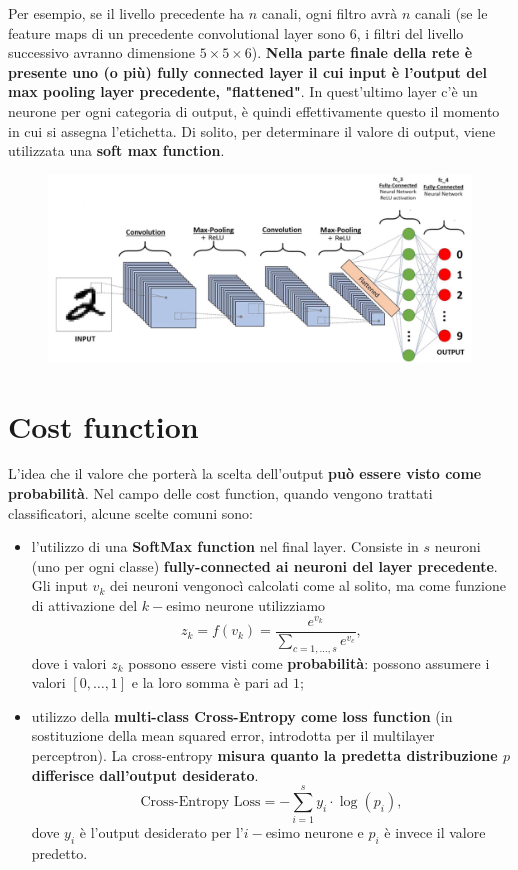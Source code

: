 Per esempio, se il livello precedente ha $n$ canali, ogni filtro avrà $n$ canali (se le feature maps di un precedente convolutional layer sono $6$, i filtri del livello successivo avranno dimensione $5\times5\times6$).
\newline
\newline
\textbf{Nella parte finale della rete è presente uno (o più)  fully connected layer il cui input è l'output del max pooling layer precedente, "flattened"}. In quest'ultimo layer c'è un neurone per ogni categoria di output, è quindi effettivamente questo il momento in cui si assegna l'etichetta. Di solito, per determinare il valore di output, viene utilizzata una \textbf{soft max function}.
\begin{figure}[!h]
    \includegraphics[scale=.5]{images/cnn/last_layer.png}
    \centering
\end{figure}
\newpage
\section{Cost function}
L'idea che il valore che porterà la scelta dell'output \textbf{può essere visto come probabilità}. Nel campo delle cost function, quando vengono trattati classificatori, alcune scelte comuni sono:
\begin{itemize}
    \item l'utilizzo di una \textbf{SoftMax function} nel final layer. Consiste in $s$ neuroni (uno per ogni classe) \textbf{fully-connected ai neuroni del layer precedente}. Gli input $v_k$ dei neuroni vengonocì calcolati come al solito, ma come funzione di attivazione del $k-$esimo neurone utilizziamo
    \begin{equation}
        z_k=f(v_k)=\frac{e^{v_k}}{\sum_{c=1,\dots,s}e^{v_c}},
    \end{equation}
    dove i valori $z_k$ possono essere visti come \textbf{probabilità}: possono assumere i valori $[0,\dots,1]$ e la loro somma è pari ad $1$;
    \item utilizzo della \textbf{multi-class Cross-Entropy come loss function} (in sostituzione della mean squared error, introdotta per il multilayer perceptron). La cross-entropy \textbf{misura quanto la  predetta distribuzione $p$ differisce dall'output desiderato}.
    \begin{equation}
        \text{Cross-Entropy Loss}=-\sum^s_{i=1}y_i\cdot\log{(p_i)},
    \end{equation}
    dove $y_i$ è l'output desiderato per l'$i-$esimo neurone e $p_i$ è invece il valore predetto.
\end{itemize}

